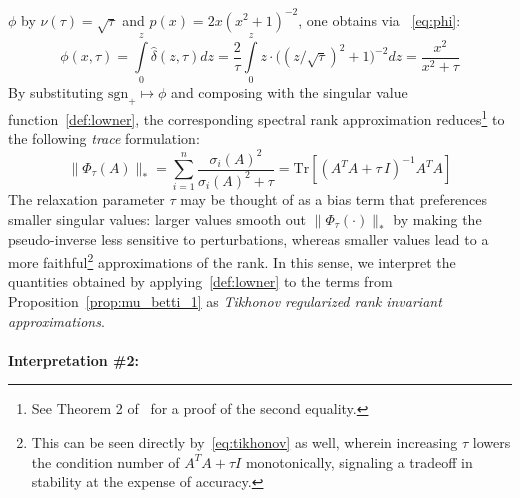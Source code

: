 \documentclass[10pt]{article}
\numberwithin{equation}{section}
\newcommand{\+}{%
	\raisebox{0.18ex}{\scaleobj{0.55}{+}}
}
\theoremstyle{definition}
\theoremstyle{definition}
\begin{document}
$\phi$ by $\nu(\tau) = \sqrt{\tau}$ and $p(x) = 2x (x^2 + 1)^{-2}$, one obtains via ~\eqref{eq:phi}:
\begin{equation}\label{eq:tikhonov_sf}
	\phi(x, \tau) = \int\limits_{0}^z \hat{\delta}(z, \tau) dz = \frac{2}{\tau}\int\limits_{0}^z z \cdot  \big((z/\sqrt{\tau})^2+1\big)^{-2} dz = \frac{x^2}{x^2 + \tau} %
\end{equation}
By substituting $\mathrm{sgn}_+ \mapsto \phi$ and composing with the singular value function~\eqref{def:lowner}, the corresponding spectral rank approximation reduces\footnote{See Theorem 2 of~\cite{zhao2012approximation} for a proof of the second equality.} to the following \emph{trace} formulation:
\begin{equation}\label{eq:tikhonov_1}
	\lVert \Phi_\tau(A) \rVert_\ast = \sum\limits_{i = 1}^n \frac{\sigma_i(A)^2}{\sigma_i(A)^2 + \tau} = \mathrm{Tr}\left[(A^T A + \tau \, I)^{-1} A^T A \right]
\end{equation}
The relaxation parameter $\tau$ may be thought of as a bias term that preferences smaller singular values: larger values smooth out $\lVert \Phi_\tau(\cdot) \rVert_\ast$ by making the pseudo-inverse less sensitive to perturbations, whereas smaller values lead to a more faithful\footnote{This can be seen directly by~\eqref{eq:tikhonov} as well, wherein increasing $\tau$ lowers the condition number of $A^T A + \tau I$ monotonically, signaling a tradeoff in stability at the expense of accuracy.} approximations of the rank.
In this sense, we interpret the quantities obtained by applying~\eqref{def:lowner} to the terms from Proposition~\ref{prop:mu_betti_1} as \emph{Tikhonov regularized rank invariant approximations}.
\\
\\
\noindent \textbf{Interpretation \#2:} 
\end{document}
